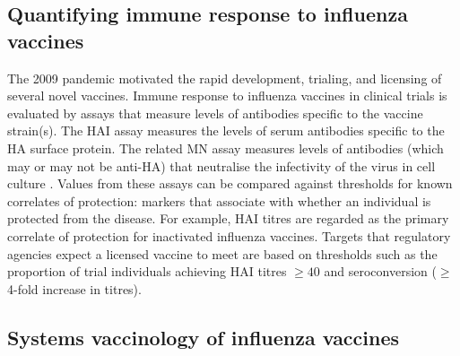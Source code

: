 \subsection{Quantifying immune response to influenza vaccines}

The 2009 pandemic motivated the rapid development, trialing, and licensing of several novel vaccines\autocite{broadbent2011InfluenzaVirusVaccines}.
%
%
Immune response to influenza vaccines in clinical trials is evaluated by assays that measure levels of antibodies specific to the vaccine strain(s).
The \gls{HAI} assay measures the levels of serum antibodies specific to the \gls{HA} surface protein.
The related \gls{MN} assay measures levels of antibodies (which may or may not be anti-\gls{HA}) that neutralise the infectivity of the virus in cell culture \autocite{klimov2012InfluenzaVirusTitration}.
Values from these assays can be compared against thresholds for known correlates of protection: markers that associate with whether an individual is protected from the disease.
For example, \gls{HAI} titres are regarded as the primary correlate of protection for inactivated influenza vaccines.
Targets that regulatory agencies expect a licensed vaccine to meet are based on thresholds such as the proportion of trial individuals achieving \gls{HAI} titres $\ge 40$ and seroconversion ($\ge$ 4-fold increase in titres)\autocite{plotkin2010CorrelatesProtectionInduced,cox2013CorrelatesProtectionInfluenza}.

\subsection{Systems vaccinology of influenza vaccines}


